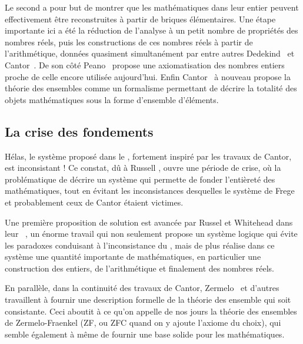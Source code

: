 Le second a pour but de montrer que les mathématiques dans leur entier peuvent
effectivement être reconstruites à partir de briques élémentaires. Une étape
importante ici a été la réduction de l’analyse à un petit nombre de propriétés
des nombres réels, puis les constructions de ces nombres réels à partir
de l’arithmétique, données quasiment simultanément par entre autres
Dedekind~ et Cantor~.
De son côté Peano~ propose
une axiomatisation des nombres entiers proche de celle encore utilisée aujourd’hui.
Enfin Cantor~ à nouveau
propose la théorie des ensembles comme un formalisme permettant
de décrire la totalité des objets mathématiques sous la forme d’ensemble
d’éléments.

\subsection{La crise des fondements}
Hélas, le système proposé dans le , fortement inspiré par
les travaux de Cantor, est inconsistant !
Ce constat, dû à Russell ,
ouvre une période de crise, où la problématique de décrire un système qui permette
de fonder l’entièreté des mathématiques,
tout en évitant les inconsistances desquelles
le système de Frege et probablement ceux de Cantor étaient victimes.

Une première proposition de solution est avancée par Russel et Whitehead dans leur
~,
un énorme travail qui non seulement propose un système
logique qui évite les paradoxes conduisant à l’inconsistance du
, mais de plus réalise dans ce système une quantité importante
de mathématiques, en particulier une construction des entiers, de l’arithmétique et
finalement des nombres réels.

En parallèle, dans la continuité des travaux de Cantor,
Zermelo~ et
d’autres travaillent à fournir une description formelle de la théorie des ensemble
qui soit consistante. Ceci aboutit à ce qu’on appelle de nos jours la
théorie des ensembles de Zermelo-Fraenkel (ZF, ou ZFC quand on y ajoute l’axiome
du choix), qui semble également à même de fournir une base solide pour les
mathématiques.

